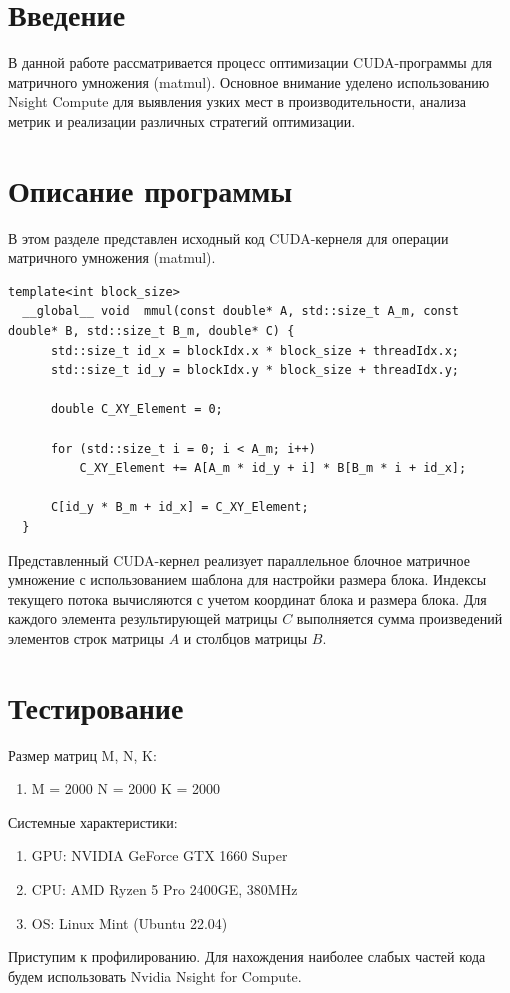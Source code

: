 \documentclass[a4paper,12pt]{article}
\begin{document}
\section{Введение}
В данной работе рассматривается процесс оптимизации CUDA-программы для матричного умножения (matmul). 
Основное внимание уделено использованию Nsight Compute для выявления узких мест в производительности, 
анализа метрик и реализации различных стратегий оптимизации.
\newpage
\section{Описание программы}

В этом разделе представлен исходный код CUDA-кернеля для операции матричного умножения (matmul).

\vspace{10pt}
\begin{lstlisting}[language=CUDA, caption={CUDA matmul}, label={code:cuda_matmul}]
  template<int block_size>
  __global__ void  mmul(const double* A, std::size_t A_m, const double* B, std::size_t B_m, double* C) {
      std::size_t id_x = blockIdx.x * block_size + threadIdx.x;
      std::size_t id_y = blockIdx.y * block_size + threadIdx.y;
  
      double C_XY_Element = 0;

      for (std::size_t i = 0; i < A_m; i++)
          C_XY_Element += A[A_m * id_y + i] * B[B_m * i + id_x];
  
      C[id_y * B_m + id_x] = C_XY_Element;
  }
\end{lstlisting}
\vspace{10pt} 

Представленный CUDA-кернел реализует параллельное блочное матричное умножение с использованием шаблона для настройки размера блока.
Индексы текущего потока вычисляются с учетом координат блока и размера блока.
Для каждого элемента результирующей матрицы $C$ выполняется сумма произведений элементов строк матрицы $A$ и столбцов матрицы $B$.

\newpage
\section{Тестирование}

Размер матриц M, N, K:
\begin{enumerate}
  \item M = 2000 N = 2000 K = 2000
\end{enumerate}

Системные характеристики:
\begin{enumerate}
  \item GPU: NVIDIA GeForce GTX 1660 Super
  \item CPU: AMD Ryzen 5 Pro 2400GE, 380MHz
  \item OS: Linux Mint (Ubuntu 22.04)
\end{enumerate}
Приступим к профилированию. Для нахождения наиболее слабых частей кода будем использовать Nvidia Nsight for Compute.
\end{document}
